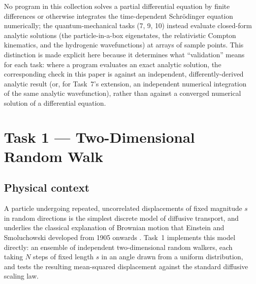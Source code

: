 \documentclass[11pt]{article}
\begin{document}
No program in this collection solves a partial differential equation by finite differences or otherwise integrates the time-dependent Schr\"odinger equation numerically; the quantum-mechanical tasks (7, 9, 10) instead evaluate closed-form analytic solutions (the particle-in-a-box eigenstates, the relativistic Compton kinematics, and the hydrogenic wavefunctions) at arrays of sample points. This distinction is made explicit here because it determines what ``validation'' means for each task: where a program evaluates an exact analytic solution, the corresponding check in this paper is against an independent, differently-derived analytic result (or, for Task~7's extension, an independent numerical integration of the same analytic wavefunction), rather than against a converged numerical solution of a differential equation.

\section{Task 1 --- Two-Dimensional Random Walk}
\label{sec:task1}

\subsection{Physical context}
A particle undergoing repeated, uncorrelated displacements of fixed magnitude $s$ in random directions is the simplest discrete model of diffusive transport, and underlies the classical explanation of Brownian motion that Einstein and Smoluchowski developed from 1905 onwards \cite{einstein1905}. Task~1 implements this model directly: an ensemble of independent two-dimensional random walkers, each taking $N$ steps of fixed length $s$ in an angle drawn from a uniform distribution, and tests the resulting mean-squared displacement against the standard diffusive scaling law.
\end{document}
